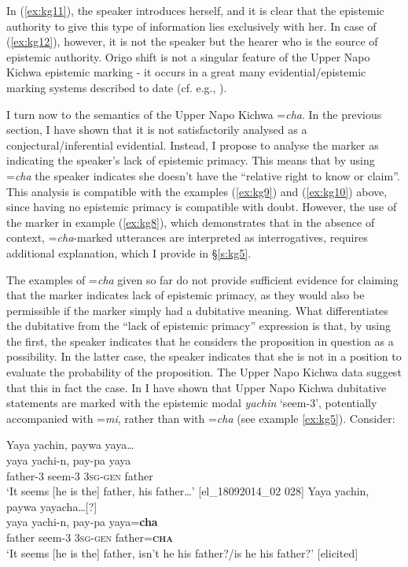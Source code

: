 \documentclass[output=paper]{langscibook}
\begin{document}
In (\ref{ex:kg11}), the speaker introduces herself, and it is clear that the epistemic authority to give this type of information lies exclusively with her. In case of (\ref{ex:kg12}), however, it is not the speaker but the hearer who is the source of epistemic authority. Origo shift is not a singular feature of the Upper Napo Kichwa epistemic marking - it occurs in a great many evidential/epistemic marking systems described to date (cf. e.g., \citealt{Hargreaves2005}).

I turn now to the semantics of the Upper Napo Kichwa =\textit{cha}. In the previous section, I have shown that it is not satisfactorily analysed as a conjectural/inferential evidential. Instead, I propose to analyse the marker as indicating the speaker’s lack of epistemic primacy. This means that by using =\textit{cha} the speaker indicates she doesn't have the “relative right to know or claim”. This analysis is compatible with the examples ‎(\ref{ex:kg9}) and (\ref{ex:kg10}) above, since having no epistemic primacy is compatible with doubt. However, the use of the marker in example ‎(\ref{ex:kg8}), which demonstrates that in the absence of context, =\textit{cha}-marked utterances are interpreted as interrogatives, requires additional explanation, which I provide in §‎\ref{s:kg5}.

The examples of =\textit{cha} given so far do not provide sufficient evidence for claiming that the marker indicates lack of epistemic primacy, as they would also be permissible if the marker simply had a dubitative meaning. What differentiates the dubitative from the “lack of epistemic primacy” expression is that, by using the first, the speaker indicates that he considers the proposition in question as a possibility. In the latter case, the speaker indicates that she is not in a position to evaluate the probability of the proposition. The Upper Napo Kichwa data suggest that this in fact the case. In   I have shown that Upper Napo Kichwa dubitative statements are marked with the epistemic modal \textit{yachin} `seem-3', potentially accompanied with =\textit{mi}, rather than with =\textit{cha} (see example \ref{ex:kg5}). Consider:

\begin{exe}
	\ex \label{ex:kg13}
	\begin{xlist}
		\ex \label{ex:kg13a}
		\glll Yaya yachin, paywa yaya…\\
		 yaya yachi-n, pay-pa yaya\\
		father-3 seem-3 3\textsc{sg}-\textsc{gen} father\\
		\trans ‘It seems [he is the] father, his father…’ [el\_18092014\_02 028]
		\ex  \label{ex:kg13b}
		\glll Yaya yachin, paywa yayacha…[?]\\
		yaya yachi-n, pay-pa yaya=\textbf{cha}\\
        father seem-3 3\textsc{sg}-\textsc{gen} father=\textbf{\textsc{cha}}\\
        \trans ‘It seems [he is the] father, isn’t he his father?/is he his father?’ [elicited]
	\end{xlist}
\end{exe}
\end{document}
